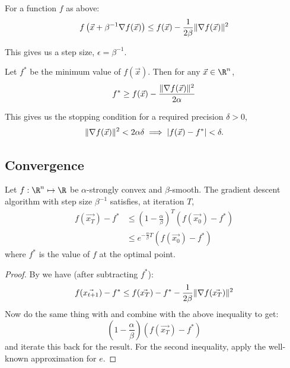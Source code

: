 \documentclass[../Main.tex]{subfiles}
\begin{document}
\begin{corollary}
    For a function $f$ as above:
    \begin{equation*}
        f\left(\vec{x} + \beta^{-1} \nabla f(\vec{x})\right) \leq f(\vec{x}) - \frac{1}{2\beta} \lVert\nabla f(\vec{x})\rVert^2
    \end{equation*}
    \label{corStepSizeBound}
\end{corollary}
\begin{remark}
    This gives us a step size, $\epsilon = \beta^{-1}$.
\end{remark}
\begin{corollary}
    Let $f^*$ be the minimum value of $f(\vec{x})$. Then for any $\vec{x} \in \R^n$,
    \begin{equation*}
        f^* \geq f(\vec{x}) - \frac{\lVert\nabla f(\vec{x})\rVert^2}{2\alpha}
    \end{equation*}
    \label{corStopCriterionBound}
\end{corollary}
\begin{remark}
    This gives us the stopping condition for a required precision $\delta > 0$,
    \begin{equation*}
        \lVert\nabla f(\vec{x})\rVert^2 < 2\alpha\delta \implies \lvert f(\vec{x}) - f^*\rvert < \delta.
    \end{equation*}
\end{remark}
\subsection{Convergence}
\begin{theorem}
    Let $f : \R^n \mapsto \R$ be $\alpha$-strongly convex and $\beta$-smooth. The gradient descent algorithm with step size $\beta^{-1}$ satisfies, at iteration $T$,
    \begin{align*}
        f(\vec{x_T}) - f^* &\leq \left(1 - \frac{\alpha}{\beta}\right)^T (f(\vec{x_0}) - f^*) \\
        &\leq e^{-\frac{\alpha}{\beta}T} (f(\vec{x_0}) - f^*)
    \end{align*}
    where $f^*$ is the value of $f$ at the optimal point.
    \label{thmGradDescConvergence}
\end{theorem}
\begin{proof}
    By  we have (after subtracting $f^*$):
    \begin{equation*}
        f(\vec{x_{t+1}}) - f^* \leq f(\vec{x_T}) - f^* - \frac1{2\beta} \lVert\nabla f(\vec{x_T})\rVert^2
    \end{equation*}
    Now do the same thing with  and combine with the above inequality to get:
    \begin{equation*}
        \left(1 - \frac{\alpha}{\beta}\right) (f(\vec{x_T}) - f^*)
    \end{equation*}
    and iterate this back for the result. For the second inequality, apply the well-known approximation for $e$.
\end{proof}
\end{document}
